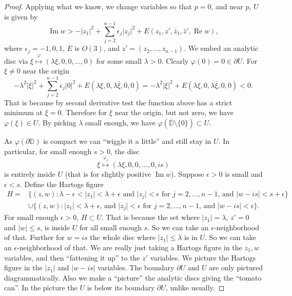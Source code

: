 \documentclass[12pt,openany]{book}
\renewcommand{\Re}{\operatorname{Re}}
\renewcommand{\Im}{\operatorname{Im}}
\newcommand{\sabs}[1]{\lvert {#1} \rvert}
\newcommand{\D}{{\mathbb{D}}}
\theoremstyle{plain}
\theoremstyle{remark}
\theoremstyle{definition}
\theoremstyle{exercise}
\theoremstyle{example}
\begin{document}
\begin{proof}
Applying what we know, we change variables so that $p = 0$, and
near $p$, $U$ is given by
\begin{equation*}
\Im w > -\sabs{z_1}^2 + \sum_{j=2}^{n-1} \epsilon_j \sabs{z_j}^2 +
E(z_1,z',\bar{z}_1,\bar{z}',\Re w) ,
\end{equation*}
where $\epsilon_j = -1,0,1$, $E$ is $O(3)$, and $z' =
(z_2,\ldots,z_{n-1})$.
We embed an analytic disc via
$\xi \overset{\varphi}{\mapsto} (\lambda \xi, 0, 0, \ldots, 0)$ for some small $\lambda > 0$.
%
Clearly $\varphi(0) = 0 \in \partial U$.  For $\xi \not= 0$ near the origin
\begin{equation*}
-\lambda^2 \sabs{\xi}^2 + \sum_{j=2}^{n-1} \epsilon_j \sabs{0}^2 + E(\lambda
\xi,0,\lambda \bar{\xi},0,0)
=
-\lambda^2 \sabs{\xi}^2 + E(\lambda
\xi,0,\lambda \bar{\xi},0,0)
< 0 .
\end{equation*}
That is because by second derivative test the function above has a strict minimum
at $\xi = 0$.  Therefore for $\xi$ near the origin, but not zero, we have 
$\varphi(\xi) \in U$.  By picking $\lambda$ small enough, we have
$\varphi(\overline{\D}\setminus\{0\}) \subset U$.

As $\varphi(\partial \D)$ is compact we can ``wiggle it a little'' and
still stay in $U$.  In particular, for small enough $s > 0$, the disc
\begin{equation*}
\xi \overset{\varphi_s}{\mapsto} (\lambda \xi, 0, 0, \ldots, 0, i s) 
\end{equation*}
is entirely inside $U$ (that is for slightly positive $\Im w$).
Suppose $\epsilon > 0$ is small and $\epsilon < s$.
Define the Hartogs figure
\begin{equation*}
\begin{split}
H =
& \{ (z,w) : \lambda - \epsilon < \sabs{z_1} < \lambda + \epsilon
\text{ and }
\sabs{z_j} < \epsilon \text{ for $j=2,\ldots,n-1$, and }
\sabs{w-is} < s+\epsilon \} 
\\
&
\cup 
\{ (z,w) : \sabs{z_1} < \lambda + \epsilon \text{, and } \sabs{z_j} < \epsilon \text{ for $j=2,\ldots,n-1$, and }
\sabs{w-is} < \epsilon \} .
\end{split}
\end{equation*}
For small enough $\epsilon >0$, $H \subset U$.
That is because the set where $\sabs{z_1} = \lambda$, $z' = 0$
and $\sabs{w} \leq s$, is inside $U$ for all small enough $s$.  So we can
take an $\epsilon$-neighborhood of that.
Further for
$w = is$ the whole disc where $\sabs{z_1} \leq \lambda$ is in $U$.
So we can take an $\epsilon$-neighborhood of that.
We are really just taking a Hartogs figure in the $z_1,w$ variables, and then
``fattening it up'' to the $z'$ variables.
We picture the Hartogs figure in the $\sabs{z_1}$ and $\sabs{w-is}$
variables.  The boundary $\partial U$ and $U$ are only pictured diagrammatically.
Also we make a ``picture'' the analytic discs giving the ``tomato can''.
In the picture the $U$ is below its boundary $\partial U$, unlike usually.


\end{proof}
\end{document}
